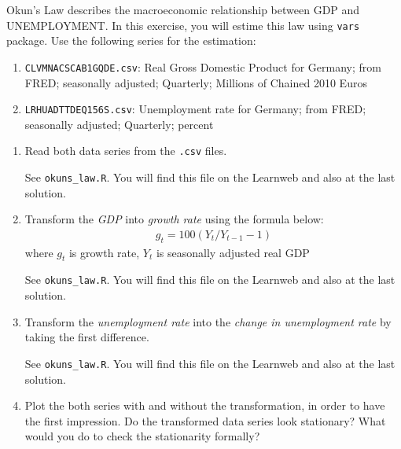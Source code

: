 Okun's Law describes the macroeconomic relationship between GDP and UNEMPLOYMENT. In this exercise, you will estime this law using \verb|vars| package. Use the following series for the estimation:
\begin{enumerate}[label=-]
    \item \verb|CLVMNACSCAB1GQDE.csv|: Real Gross Domestic Product for Germany; from FRED; seasonally adjusted; Quarterly; Millions of Chained 2010 Euros

    \item \verb|LRHUADTTDEQ156S.csv|: Unemployment rate for Germany; from FRED; seasonally adjusted; Quarterly; percent
\end{enumerate}

\begin{enumerate}
    \item Read both data series from the \texttt{.csv} files.

          \begin{sol}
              See \texttt{okuns\_law.R}. You will find this file on the Learnweb and also at the last solution.
          \end{sol}

    \item Transform the \emph{GDP} into \emph{growth rate} using the formula below:
          \begin{align}
              g_t = 100 (Y_t / Y_{t-1} - 1) \label{eq-gdp-growth_rate}
          \end{align}
          where $g_t$ is growth rate, $Y_t$ is seasonally adjusted real GDP

          \begin{sol}
              See \texttt{okuns\_law.R}. You will find this file on the Learnweb and also at the last solution.
          \end{sol}

    \item Transform the \emph{unemployment rate} into the \emph{change in unemployment rate} by taking the first difference.

          \begin{sol}
              See \texttt{okuns\_law.R}. You will find this file on the Learnweb and also at the last solution.
          \end{sol}

    \item Plot the both series with and without the transformation, in order to have the first impression. Do the transformed data series look stationary? What would you do to check the stationarity formally?


\end{enumerate}
